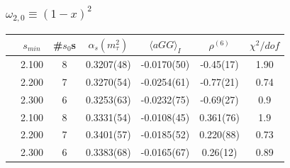 \documentclass[fleqn]{beamer}
\begin{document}
\begin{frame}
  \frametitle{\(\omega_{2,0} \equiv (1-x)^2\)}
  \centering
  \begin{tabular}{ccccccc}
    \toprule
    & \(s_{min}\) & \#\(s_0\)s & \(\alpha_s(m_\tau^2)\) & \(\langle aGG \rangle_I\) & \(\rho^{(6)}\) & \(\chi^2/dof\)  \\
    \midrule


    \parbox[t]{2mm}{}
    & 2.100 & 8 & 0.3207(48) & -0.0170(50) & -0.45(17) & 1.90 \\
    & 2.200 & 7 & 0.3270(54) & -0.0254(61) & -0.77(21) & 0.74 \\
    & 2.300 & 6 & 0.3253(63) & -0.0232(75) & -0.69(27) & 0.9  \\
    \midrule
    \parbox[t]{2mm}{} & 2.100 & 8 & 0.3331(54) & -0.0108(45) & 0.361(76) & 1.9 \\
    & 2.200 & 7  & 0.3401(57) & -0.0185(52) & 0.220(88) & 0.73 \\
    & 2.300 & 6  & 0.3383(68) & -0.0165(67) & 0.26(12) & 0.89 \\
    \bottomrule
  \end{tabular}
\end{frame}
\end{document}
